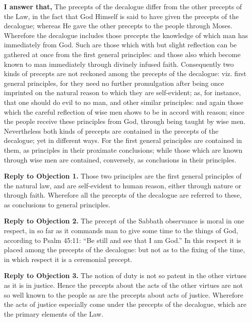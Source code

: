\textbf{I answer that,} The precepts of the decalogue differ from the other precepts of the Law, in the fact that God Himself is said to have given the precepts of the decalogue; whereas He gave the other precepts to the people through Moses. Wherefore the decalogue includes those precepts the knowledge of which man has immediately from God. Such are those which with but slight reflection can be gathered at once from the first general principles: and those also which become known to man immediately through divinely infused faith. Consequently two kinds of precepts are not reckoned among the precepts of the decalogue: viz. first general principles, for they need no further promulgation after being once imprinted on the natural reason to which they are self-evident; as, for instance, that one should do evil to no man, and other similar principles: and again those which the careful reflection of wise men shows to be in accord with reason; since the people receive these principles from God, through being taught by wise men. Nevertheless both kinds of precepts are contained in the precepts of the decalogue; yet in different ways. For the first general principles are contained in them, as principles in their proximate conclusions; while those which are known through wise men are contained, conversely, as conclusions in their principles.

\textbf{Reply to Objection 1.} Those two principles are the first general principles of the natural law, and are self-evident to human reason, either through nature or through faith. Wherefore all the precepts of the decalogue are referred to these, as conclusions to general principles.

\textbf{Reply to Objection 2.} The precept of the Sabbath observance is moral in one respect, in so far as it commands man to give some time to the things of God, according to Psalm 45:11: ``Be still and see that I am God.'' In this respect it is placed among the precepts of the decalogue: but not as to the fixing of the time, in which respect it is a ceremonial precept.

\textbf{Reply to Objection 3.} The notion of duty is not so patent in the other virtues as it is in justice. Hence the precepts about the acts of the other virtues are not so well known to the people as are the precepts about acts of justice. Wherefore the acts of justice especially come under the precepts of the decalogue, which are the primary elements of the Law.


